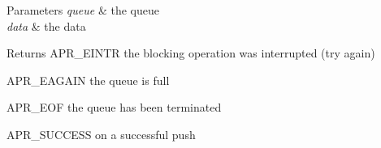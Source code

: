\begin{DoxyParams}{Parameters}
{\em queue} & the queue \\
\hline
{\em data} & the data \\
\hline
\end{DoxyParams}
\begin{DoxyReturn}{Returns}
A\-P\-R\-\_\-\-E\-I\-N\-T\-R the blocking operation was interrupted (try again) 

A\-P\-R\-\_\-\-E\-A\-G\-A\-I\-N the queue is full 

A\-P\-R\-\_\-\-E\-O\-F the queue has been terminated 

A\-P\-R\-\_\-\-S\-U\-C\-C\-E\-S\-S on a successful push 
\end{DoxyReturn}
